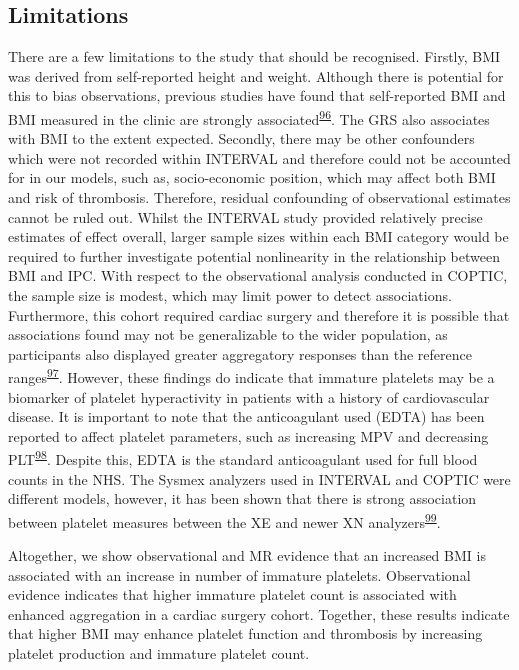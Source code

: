 \documentclass[11pt,twoside]{bristolthesis}
\begin{document}
\hypertarget{INTERVAL-limitations}{%
\subsection{Limitations}\label{INTERVAL-limitations}}

There are a few limitations to the study that should be recognised. Firstly, BMI was derived from self-reported height and weight. Although there is potential for this to bias observations, previous studies have found that self-reported BMI and BMI measured in the clinic are strongly associated\textsuperscript{\protect\hyperlink{ref-Nikolaou2017}{96}}. The GRS also associates with BMI to the extent expected. Secondly, there may be other confounders which were not recorded within INTERVAL and therefore could not be accounted for in our models, such as, socio-economic position, which may affect both BMI and risk of thrombosis. Therefore, residual confounding of observational estimates cannot be ruled out. Whilst the INTERVAL study provided relatively precise estimates of effect overall, larger sample sizes within each BMI category would be required to further investigate potential nonlinearity in the relationship between BMI and IPC. With respect to the observational analysis conducted in COPTIC, the sample size is modest, which may limit power to detect associations. Furthermore, this cohort required cardiac surgery and therefore it is possible that associations found may not be generalizable to the wider population, as participants also displayed greater aggregatory responses than the reference ranges\textsuperscript{\protect\hyperlink{ref-Marcucci2015}{97}}. However, these findings do indicate that immature platelets may be a biomarker of platelet hyperactivity in patients with a history of cardiovascular disease. It is important to note that the anticoagulant used (EDTA) has been reported to affect platelet parameters, such as increasing MPV and decreasing PLT\textsuperscript{\protect\hyperlink{ref-Mannuuxdf2020}{98}}. Despite this, EDTA is the standard anticoagulant used for full blood counts in the NHS. The Sysmex analyzers used in INTERVAL and COPTIC were different models, however, it has been shown that there is strong association between platelet measures between the XE and newer XN analyzers\textsuperscript{\protect\hyperlink{ref-Briggs2012}{99}}.

Altogether, we show observational and MR evidence that an increased BMI is associated with an increase in number of immature platelets. Observational evidence indicates that higher immature platelet count is associated with enhanced aggregation in a cardiac surgery cohort. Together, these results indicate that higher BMI may enhance platelet function and thrombosis by increasing platelet production and immature platelet count.
\end{document}
